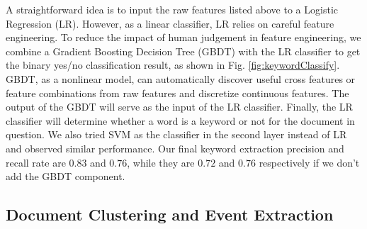 A straightforward idea is to input the raw features listed above to a Logistic Regression (LR). However, as a linear classifier, LR relies on careful feature engineering.
To reduce the impact of human judgement in feature engineering, we combine a Gradient Boosting Decision Tree (GBDT) with the LR classifier to get the binary yes/no classification result, as shown in Fig. \ref{fig:keywordClassify}. GBDT, as a nonlinear model, can automatically discover useful cross features or feature combinations from raw features and discretize continuous features. 
The output of the GBDT will serve as the input of the LR classifier. Finally, the LR classifier will determine whether a word is a keyword or not for the document in question. We also tried SVM as the classifier in the second layer instead of LR and observed similar performance. Our final keyword extraction precision and recall rate are $0.83$ and $0.76$, while they are $0.72$ and $0.76$ respectively if we don't add the GBDT component.

\subsection{Document Clustering and Event Extraction}
\label{subsec:eventClustering}


	

